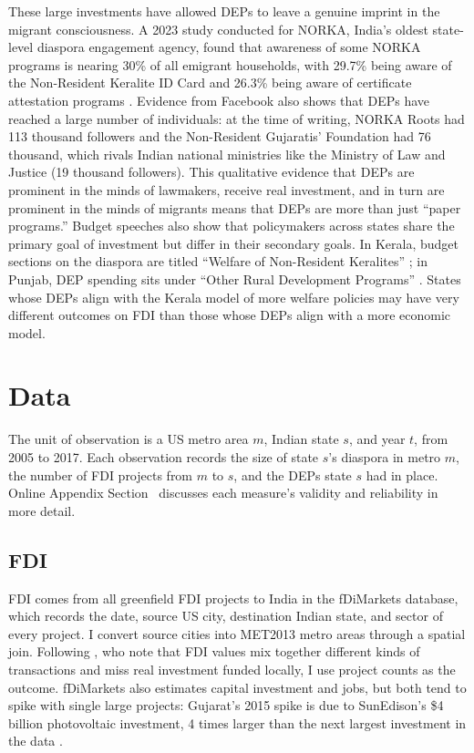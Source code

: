 \documentclass[12pt]{article}
\begin{document}
These large investments have allowed DEPs to leave a genuine imprint in the migrant consciousness. A 2023 study conducted for NORKA, India's oldest state-level diaspora engagement agency, found that awareness of some NORKA programs is nearing 30\% of all emigrant households, with 29.7\% being aware of the Non-Resident Keralite ID Card and 26.3\% being aware of certificate attestation programs \citep{rajan_kerala_2023}. Evidence from Facebook also shows that DEPs have reached a large number of individuals: at the time of writing, NORKA Roots had 113 thousand followers and the Non-Resident Gujaratis' Foundation had 76 thousand, which rivals Indian national ministries like the Ministry of Law and Justice (19 thousand followers). This qualitative evidence that DEPs are prominent in the minds of lawmakers, receive real investment, and in turn are prominent in the minds of migrants means that DEPs are more than just ``paper programs.'' Budget speeches also show that policymakers across states share the primary goal of investment but differ in their secondary goals. In Kerala, budget sections on the diaspora are titled ``Welfare of Non-Resident Keralites'' \citep{isaac_government_2016}; in Punjab, DEP spending sits under ``Other Rural Development Programs'' \citep{finance_department_punjab_detailed_2013}. States whose DEPs align with the Kerala model of more welfare policies may have very different outcomes on FDI than those whose DEPs align with a more economic model.

\section{Data} \label{sec:data}

The unit of observation is a US metro area $m$, Indian state $s$, and year $t$, from 2005 to 2017. Each observation records the size of state $s$'s diaspora in metro $m$, the number of FDI projects from $m$ to $s$, and the DEPs state $s$ had in place. Online Appendix Section~ discusses each measure's validity and reliability in more detail.

\subsection{FDI}

FDI comes from all greenfield FDI projects to India in the fDiMarkets database, which records the date, source US city, destination Indian state, and sector of every project. I convert source cities into MET2013 metro areas through a spatial join. Following \citet{desbordes_effects_2017}, who note that FDI values mix together different kinds of transactions and miss real investment funded locally, I use project counts as the outcome. fDiMarkets also estimates capital investment and jobs, but both tend to spike with single large projects: Gujarat's 2015 spike is due to SunEdison's \$4 billion photovoltaic investment, 4 times larger than the next largest investment in the data \citep{inc_sunedison_nodate}.
\end{document}
